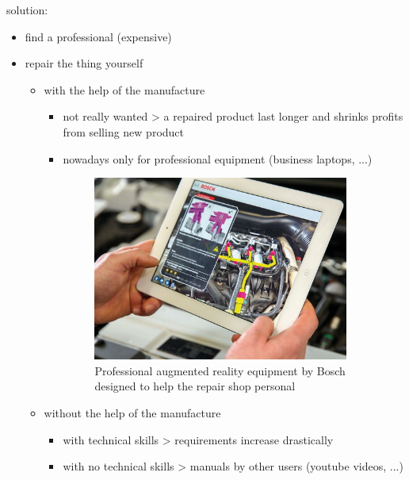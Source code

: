 	solution:
	\begin{itemize}
		\itemsep0em
		\item find a professional (expensive)
		\item repair the thing yourself \begin{itemize}
			\itemsep0em
			\item with the help of the manufacture \begin{itemize}
				\item not really wanted > a repaired product last longer and shrinks profits from selling new product
				\item nowadays only for professional equipment (business laptops, ...)
					
					\begin{figure}[H]
						\includegraphics[width=0.9\textwidth]{../images/bosch-flex-inspect.jpg}
						\centering
						\caption[Professional augmented reality equipment by Bosch designed to help the repair shop personal]{Professional augmented reality equipment by Bosch designed to help the repair shop personal\footnotemark}
					\end{figure}
			\end{itemize}
			\item without the help of the manufacture \begin{itemize}
				\itemsep0em
				\item with technical skills > requirements increase drastically
				\item with no technical skills > manuals by other users (youtube videos, ...)
			\end{itemize}
			\begin{figure}[H]

\end{figure}
\end{itemize}
\end{itemize}

